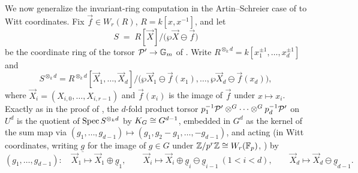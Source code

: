 We now generalize the invariant-ring computation in the Artin--Schreier case of
 to Witt coordinates. Fix
$\vec f \in W_r(R)$, $R = k[x, x^{-1}]$, and let
\[
S \;=\; R[\vec X]\big/\bigl(\wp \vec X \ominus \vec f\bigr)
\]
be the coordinate ring of the torsor $\mathcal{P}' \to \mathbb{G}_m$ of
. Write
$R^{\otimes_k d} = k[x_1^{\pm 1}, \dots, x_d^{\pm 1}]$ and
\[
S^{\otimes_k d}
= R^{\otimes_k d}[\vec X_1, \dots, \vec X_d]\big/
\bigl(\wp \vec X_1 \ominus \vec f(x_1), \dots, \wp \vec X_d \ominus \vec f(x_d)\bigr),
\]
where $\vec X_i = (X_{i,0}, \dots, X_{i,r-1})$ and $\vec f(x_i)$ is the image of
$\vec f$ under $x \mapsto x_i$. Exactly as in the proof of
, the $d$-fold product torsor
$p_1^{-1}\mathcal{P}' \otimes^G \cdots \otimes^G p_d^{-1}\mathcal{P}'$ on $U^d$ is the quotient of
$\operatorname{Spec} S^{\otimes_k d}$ by $K_{G} \cong G^{d-1}$, embedded in $G^d$ as the kernel of the
sum map via $(g_1, \dots, g_{d-1}) \mapsto (g_1, g_2 - g_1, \dots, -g_{d-1})$, and
acting (in Witt coordinates, writing $\underline g$ for the image of $g \in G$ under
$\mathbb{Z}/p^r\mathbb{Z} \cong W_r(\mathbb{F}_p)$, ) by
\[
(g_1, \dots, g_{d-1}) \colon \quad
\vec X_1 \mapsto \vec X_1 \oplus \underline g_1, \qquad
\vec X_i \mapsto \vec X_i \oplus \underline g_i \ominus \underline g_{i-1}
\ (1 < i < d), \qquad
\vec X_d \mapsto \vec X_d \ominus \underline g_{d-1}.
\]

